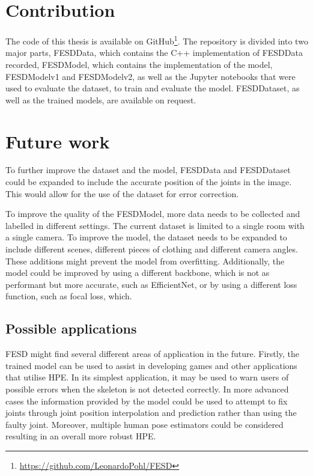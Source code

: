 \section{Contribution}

The code of this thesis is available on GitHub\footnote{\url{https://github.com/LeonardoPohl/FESD}}. The repository is divided into two major parts, FESDData, which contains the C++ implementation of FESDData recorded, FESDModel, which contains the implementation of the model, FESDModelv1 and FESDModelv2, as well as the Jupyter notebooks that were used to evaluate the dataset, to train and evaluate the model. FESDDataset, as well as the trained models, are available on request.

\section{Future work}
\label{sec:future_work}

To further improve the dataset and the model, FESDData and FESDDataset could be expanded to include the accurate position of the joints in the image. This would allow for the use of the dataset for error correction.

To improve the quality of the FESDModel, more data needs to be collected and labelled in different settings. The current dataset is limited to a single room with a single camera. To improve the model, the dataset needs to be expanded to include different scenes, different pieces of clothing and different camera angles. These additions might prevent the model from overfitting. Additionally, the model could be improved by using a different backbone, which is not as performant but more accurate, such as EfficientNet, or by using a different loss function, such as focal loss, which.

\subsection{Possible applications}

FESD might find several different areas of application in the future. Firstly, the trained model can be used to assist in developing games and other applications that utilise HPE. In its simplest application, it may be used to warn users of possible errors when the skeleton is not detected correctly. In more advanced cases the information provided by the model could be used to attempt to fix joints through joint position interpolation and prediction rather than using the faulty joint. Moreover, multiple human pose estimators could be considered resulting in an overall more robust HPE.

